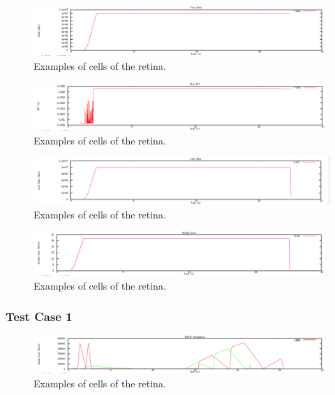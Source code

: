 \documentclass[12pt]{article}
\begin{document}
\begin{figure}[t]
\centering \includegraphics[scale=.35]{figures/Test0_Vegas/flow_rate.png}
\caption{Examples of cells of the retina.}
\label{fig:test0_vegas_flow_rate}
\end{figure}

\begin{figure}[t]
\centering \includegraphics[scale=.35]{figures/Test0_Vegas/flow_rtt.png}
\caption{Examples of cells of the retina.}
\label{fig:test0_vegas_flow_rtt}
\end{figure}

\begin{figure}[t]
\centering \includegraphics[scale=.35]{figures/Test0_Vegas/link_rate.png}
\caption{Examples of cells of the retina.}
\label{fig:test0_vegas_link_rate}
\end{figure}

\begin{figure}[t]
\centering \includegraphics[scale=.35]{figures/Test0_Vegas/window_size.png}
\caption{Examples of cells of the retina.}
\label{fig:test0_vegas_window_size}
\end{figure}

\subsubsection{Test Case 1}

\begin{figure}[t]
\centering \includegraphics[scale=.35]{figures/Test1_Tahoe/buffer_occ.png}
\caption{Examples of cells of the retina.}
\label{fig:test1_tahoe_buffer_occ}
\end{figure}
\end{document}
